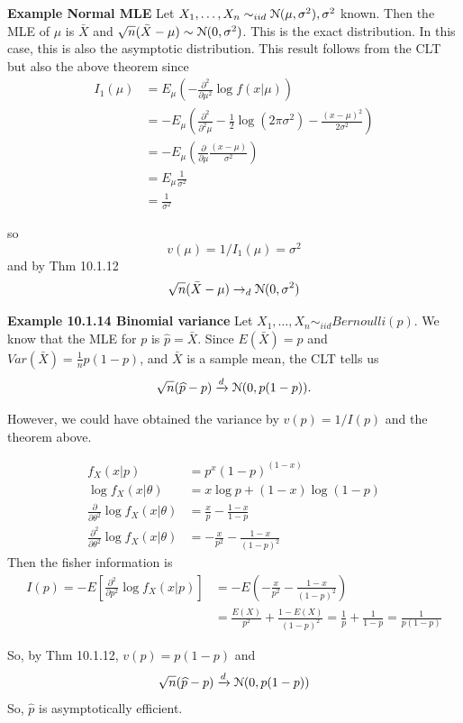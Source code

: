 \documentclass[11pt,]{article}
\newcommand{\Xndots}{X_1, \ldots, X_n}
\def\phat{{\widehat p}}
\def\Xbar{\bar{ X}}
\def\Nsc{{\cal N}}
\begin{document}
\noindent\textbf{Example Normal MLE} Let
\(\Xndots \sim_{iid} \Nsc(\mu,\sigma^2), \sigma^2\) known. Then the MLE
of \(\mu\) is \(\Xbar\) and
\(\sqrt{n} (\Xbar - \mu) \sim \Nsc(0,\sigma^2)\). This is the exact
distribution. In this case, this is also the asymptotic distribution.
This result follows from the CLT but also the above theorem since
\begin{align*}
I_1(\mu) &=
E_\mu\left(- \frac{\partial^2}{\partial \mu^2} \log f(x|\mu)\right)\\
&= -  E_\mu\left(\frac{\partial^2}{\partial^2 \mu} 
-\frac{1}{2}\log(2\pi\sigma^2) - \frac{(x-\mu)^2}{2\sigma^2}
\right) \\
&= - E_\mu \left(\frac{\partial}{\partial \mu} \frac{(x-\mu)}{\sigma^2}
\right)\\
&= E_\mu \frac{1}{\sigma^2}\\
&= \frac{1}{\sigma^2}
\end{align*}

so \[v(\mu) = 1/I_1(\mu) = \sigma^2\] and by Thm 10.1.12
\[\sqrt{n}(\Xbar - \mu) \to_d \Nsc(0, \sigma^2)\]

\noindent\textbf{Example 10.1.14 Binomial variance} Let
\(\Xndots \sim_{iid} Bernoulli(p)\). We know that the MLE for \(p\) is
\(\phat = \Xbar\). Since \(E(\Xbar) = p\) and
\(Var(\Xbar) = \frac{1}{n} p(1-p)\), and \(\Xbar\) is a sample mean, the
CLT tells us \[\sqrt{n}(\phat - p) \xrightarrow{d} \Nsc(0, p(1-p)).\]

However, we could have obtained the variance by \(v(p) = 1/I(p)\) and
the theorem above.

\begin{align*}
f_X(x|p) &= p^x(1-p)^{(1-x)}\\
\log f_X(x|\theta) &= x \log p + (1-x)\log(1-p)\\
\frac{\partial}{\partial \theta^2}\log f_X(x|\theta) &= \frac{x}{p} - \frac{1-x}{1-p}\\
\frac{\partial^2}{\partial \theta^2}\log f_X(x|\theta) &= - \frac{x}{p^2} - \frac{1-x}{(1-p)^2}
\end{align*} Then the fisher information is \begin{align*}
I(p) = -E\left[\frac{\partial^2}{\partial p^2}\log f_X(x|p)\right]&= -E\left(- \frac{x}{p^2} - \frac{1-x}{(1-p)^2}\right)\\
&=  \frac{E(X)}{p^2} + \frac{1-E(X)}{(1-p)^2} = \frac{1}{p} + \frac{1}{1-p} = \frac{1}{p(1-p)}
\end{align*}

So, by Thm 10.1.12, \(v(p) = p(1-p)\) and
\[\sqrt{n}(\phat - p) \xrightarrow{d} \Nsc(0, p(1-p))\] So, \(\phat\) is
asymptotically efficient.
\end{document}

